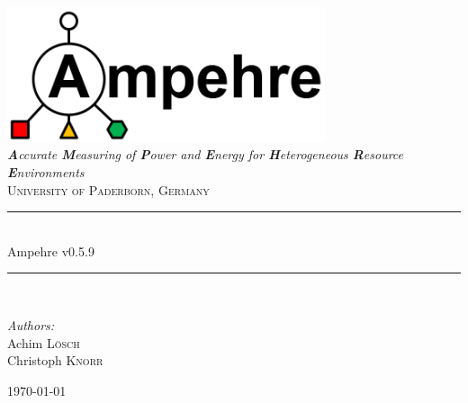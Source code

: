 %
%
%
%
%
%

\begin{titlepage}

\begin{center}

\includegraphics[width=0.7\textwidth]{figures/ampehre_logo.png}\\[1cm]

\textit{\LARGE \textbf{A}ccurate \textbf{M}easuring of \textbf{P}ower and \textbf{E}nergy for \textbf{H}eterogeneous \textbf{R}esource \textbf{E}nvironments}\\[1cm]

\textsc{\Large University of Paderborn, Germany}\\[1cm]

\newcommand{\HRule}{\rule{\linewidth}{0.5mm}} \HRule \\[0.6cm] { \huge Ampehre v0.5.9}\\[0.4cm]

\HRule\\[1cm]

\begin{minipage}{0.4\textwidth} \begin{center} \large \emph{Authors:}\\ Achim \textsc{L\"osch}\\Christoph \textsc{Knorr} \end{center} \end{minipage}

\vfill

{\Large \today}

\end{center}

\end{titlepage}

\tableofcontents
